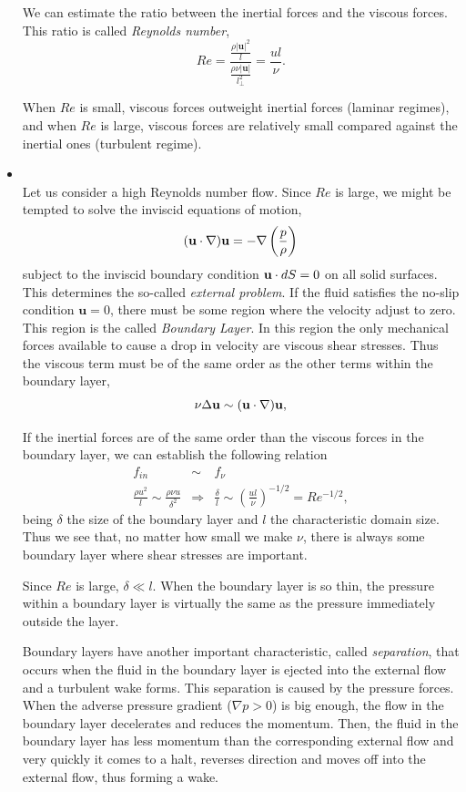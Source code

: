 \begin{itemize}
We can estimate the ratio between the inertial forces and the viscous forces. This ratio is called \textit{Reynolds number},
$$Re=\frac{\frac{\rho |\mathbf{u}|^2}{l}}{\frac{\rho\nu|\mathbf{u}|}{l_\bot^2}}=\frac{ul}{\nu}.$$

When $ Re $ is small, viscous forces outweight inertial forces (laminar regimes), and when $ Re $ is large, viscous forces are relatively small compared against the inertial ones (turbulent regime).

\item{}\\ Let us consider a high Reynolds number flow. Since $Re$ is large, we might be tempted to solve the inviscid equations of motion, 
$$({\bf u}\cdot\nabla){\bf u}=-\nabla\left(\frac{p}{\rho}\right)$$
subject to the inviscid boundary condition ${\bf u}\cdot dS=0$ on all solid surfaces. This determines the so-called \textit{external problem}. If the fluid satisfies the no-slip condition $\mathbf{u}=0$, there must be some region where the velocity adjust to zero. This region is the called \textit{Boundary Layer}. In this region the only mechanical forces available to cause a drop in velocity are viscous shear stresses. Thus the viscous term must be of the same order as the other terms within the boundary layer, 
$$\nu\Delta{\bf u}\sim({\bf u}\cdot\nabla){\bf u},$$

If the inertial forces are of the same order than the viscous forces in the boundary layer, we can establish the following relation
\begin{eqnarray*}
f_{in}&\sim& f_\nu\\
\frac{\rho u^2}{l} \sim\frac{\rho\nu u}{\delta^2} &\Rightarrow& \frac{\delta}{l}\sim\left(\frac{ul}{\nu}\right)^{-1/2}=Re^{-1/2},
\end{eqnarray*}
being $\delta$ the size of the boundary layer and $l$ the characteristic domain size. Thus we see that, no matter how small we make $\nu$, there is always some boundary layer where shear stresses are important.

Since $Re$ is large, $\delta\ll l.$ When the boundary layer is so thin, the pressure within a boundary layer is virtually the same as the pressure immediately outside the layer.

Boundary layers have another important characteristic, called \textit{separation}, that occurs when the fluid in the boundary layer is ejected into the external flow and a turbulent wake forms. This separation is caused by the pressure forces. When the adverse pressure gradient ($\nabla p>0$) is big enough, the flow in the boundary layer decelerates and reduces the momentum. Then, the fluid in the boundary layer has less momentum than the corresponding external flow and very quickly it comes to a halt, reverses direction and moves off into the external flow, thus forming a wake.


\end{itemize}
